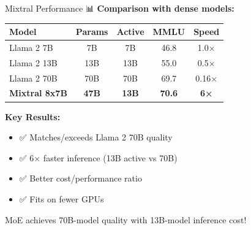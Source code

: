 \documentclass[aspectratio=169]{beamer}
\begin{document}
\begin{frame}{Mixtral Performance 📊}
\textbf{Comparison with dense models:}

\vspace{0.5em}

\begin{table}
\small
\begin{tabular}{l c c c c}
\toprule
\textbf{Model} & \textbf{Params} & \textbf{Active} & \textbf{MMLU} & \textbf{Speed} \\
\midrule
Llama 2 7B & 7B & 7B & 46.8 & 1.0× \\
Llama 2 13B & 13B & 13B & 55.0 & 0.5× \\
Llama 2 70B & 70B & 70B & 69.7 & 0.16× \\
\textbf{Mixtral 8x7B} & \textbf{47B} & \textbf{13B} & \textbf{70.6} & \textbf{6×} \\
\bottomrule
\end{tabular}
\end{table}

\vspace{0.5em}

\textbf{Key Results:}
\begin{itemize}\setlength{\itemsep}{0pt}
    \item ✅ Matches/exceeds Llama 2 70B quality
    \item ✅ 6× faster inference (13B active vs 70B)
    \item ✅ Better cost/performance ratio
    \item ✅ Fits on fewer GPUs
\end{itemize}

\vspace{0.5em}

\begin{thinkbox}
MoE achieves 70B-model quality with 13B-model inference cost!
\end{thinkbox}
\end{frame}
\end{document}
